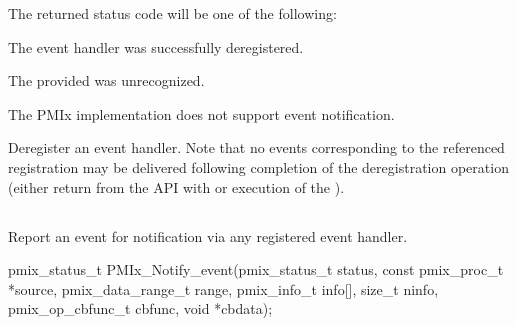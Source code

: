 The returned status code will be one of the following:

\begin{constantdesc}
\item {} The event handler was successfully deregistered.
\item {} The provided  was unrecognized.
\item {} The \ac{PMIx} implementation does not support event notification.
\end{constantdesc}

\descr

Deregister an event handler. Note that no events corresponding to the referenced registration may be delivered following completion of the deregistration operation (either return from the \ac{API} with  or execution of the ).

\subsection{}

\summary

Report an event for notification via any
registered event handler.

\format

\cspecificstart
\begin{codepar}
pmix_status_t
PMIx_Notify_event(pmix_status_t status,
                  const pmix_proc_t *source,
                  pmix_data_range_t range,
                  pmix_info_t info[], size_t ninfo,
                  pmix_op_cbfunc_t cbfunc, void *cbdata);
\end{codepar}
\cspecificend

\begin{arglist}
\end{arglist}

